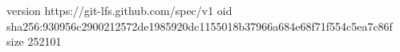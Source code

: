 version https://git-lfs.github.com/spec/v1
oid sha256:930956c2900212572de1985920dc1155018b37966a684e68f71f554c5ea7c86f
size 252101
